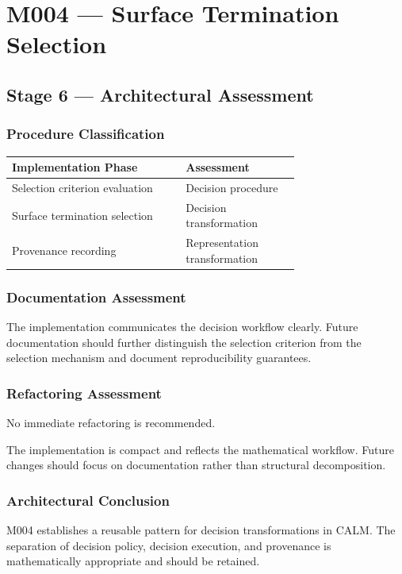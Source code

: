 \chapter{M004 --- Surface Termination Selection}

\section{Stage 6 --- Architectural Assessment}

\subsection{Procedure Classification}

\begin{center}
\begin{tabular}{|p{0.44\linewidth}|p{0.28\linewidth}|}
\hline
Implementation Phase & Assessment\\
\hline
Selection criterion evaluation & Decision procedure\\
Surface termination selection & Decision transformation\\
Provenance recording & Representation transformation\\
\hline
\end{tabular}
\end{center}

\subsection{Documentation Assessment}

The implementation communicates the decision workflow clearly. Future
documentation should further distinguish the selection criterion from
the selection mechanism and document reproducibility guarantees.

\subsection{Refactoring Assessment}

No immediate refactoring is recommended.

The implementation is compact and reflects the mathematical workflow.
Future changes should focus on documentation rather than structural
decomposition.

\subsection{Architectural Conclusion}

M004 establishes a reusable pattern for decision transformations in
CALM. The separation of decision policy, decision execution, and
provenance is mathematically appropriate and should be retained.
